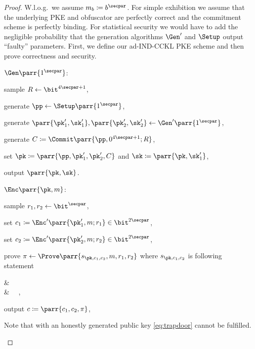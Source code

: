 \begin{proof}
    W.l.o.g.\ we assume \(m_b \coloneqq b^\secpar\).
    For simple exhibition we assume that the underlying PKE and obfuscator are perfectly correct and the commitment scheme is perfectly binding.
    For statistical security we would have to add the negligible probability that the generation algorithms \(\Gen'\) and \(\Setup\) output \enquote{faulty} parameters.
    First, we define our ad-IND-CCKL PKE scheme and then prove correctness and security.
    \begin{sitemize}
        \item \(\Gen\parr{1^\secpar}\):
        \begin{sitemize}
            \item sample \(R \gets \bit^{4\secpar+1}\),
            \item generate \(\pp \gets \Setup\parr{1^{\secpar}}\),
            \item generate \(\parr{\pk'_1,\sk'_1}, \parr{\pk'_2,\sk'_2} \gets \Gen'\parr{1^{\secpar}}\),
            \item generate \(C \coloneqq \Commit\parr{\pp,0^{4\secpar+1};R}\),
            \item set \(\pk \coloneqq \parr{\pp,\pk'_1,\pk'_2,C}\) and \(\sk \coloneqq \parr{\pk,\sk'_1}\),
            \item output \(\parr{\pk,\sk}\).
        \end{sitemize}

        \item \(\Enc\parr{\pk,m}\):
        \begin{sitemize}
            \item sample \(r_1,r_2 \gets \bit^\secpar\),
            \item set \(c_1 \coloneqq \Enc'\parr{\pk'_1,m;r_1} \in \bit^{2\secpar}\),
            \item set \(c_2 \coloneqq \Enc'\parr{\pk'_2,m;r_2} \in \bit^{2\secpar}\),
            \item prove \(\pi \gets \Prove\parr{s_{\pk,c_1,c_2},m,r_1,r_2}\) where \(s_{\pk,c_1,c_2}\) is following statement
            \begin{bralign}\label{eq:consistency}
                &\ 
                \\\label{eq:trapdoor}
                \vee
                &\ 
                \ ,
            \end{bralign}
            \item output \(c \coloneqq \parr{c_1,c_2,\pi}\),
        \end{sitemize}
        Note that with an honestly generated public key \cref{eq:trapdoor} cannot be fulfilled.


\end{sitemize}
\end{proof}
